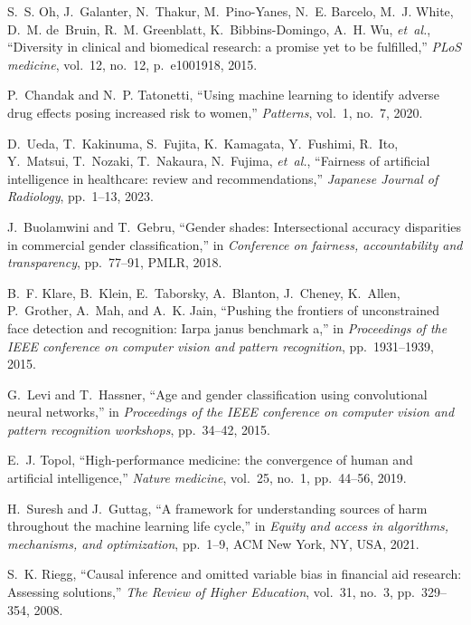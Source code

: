 \documentclass{article}
\begin{document}
\begin{thebibliography}{100}
	S.~S. Oh, J.~Galanter, N.~Thakur, M.~Pino-Yanes, N.~E. Barcelo, M.~J. White,
	D.~M. de~Bruin, R.~M. Greenblatt, K.~Bibbins-Domingo, A.~H. Wu, {\em et~al.},
	``Diversity in clinical and biomedical research: a promise yet to be
	fulfilled,'' {\em PLoS medicine}, vol.~12, no.~12, p.~e1001918, 2015.
	
	P.~Chandak and N.~P. Tatonetti, ``Using machine learning to identify adverse
	drug effects posing increased risk to women,'' {\em Patterns}, vol.~1, no.~7,
	2020.
	
	D.~Ueda, T.~Kakinuma, S.~Fujita, K.~Kamagata, Y.~Fushimi, R.~Ito, Y.~Matsui,
	T.~Nozaki, T.~Nakaura, N.~Fujima, {\em et~al.}, ``Fairness of artificial
	intelligence in healthcare: review and recommendations,'' {\em Japanese
		Journal of Radiology}, pp.~1--13, 2023.
	
	J.~Buolamwini and T.~Gebru, ``Gender shades: Intersectional accuracy
	disparities in commercial gender classification,'' in {\em Conference on
		fairness, accountability and transparency}, pp.~77--91, PMLR, 2018.
	
	B.~F. Klare, B.~Klein, E.~Taborsky, A.~Blanton, J.~Cheney, K.~Allen,
	P.~Grother, A.~Mah, and A.~K. Jain, ``Pushing the frontiers of unconstrained
	face detection and recognition: Iarpa janus benchmark a,'' in {\em
		Proceedings of the IEEE conference on computer vision and pattern
		recognition}, pp.~1931--1939, 2015.
	
	G.~Levi and T.~Hassner, ``Age and gender classification using convolutional
	neural networks,'' in {\em Proceedings of the IEEE conference on computer
		vision and pattern recognition workshops}, pp.~34--42, 2015.
	
	E.~J. Topol, ``High-performance medicine: the convergence of human and
	artificial intelligence,'' {\em Nature medicine}, vol.~25, no.~1, pp.~44--56,
	2019.
	
	H.~Suresh and J.~Guttag, ``A framework for understanding sources of harm
	throughout the machine learning life cycle,'' in {\em Equity and access in
		algorithms, mechanisms, and optimization}, pp.~1--9, ACM New York, NY, USA,
	2021.
	
	S.~K. Riegg, ``Causal inference and omitted variable bias in financial aid
	research: Assessing solutions,'' {\em The Review of Higher Education},
	vol.~31, no.~3, pp.~329--354, 2008.
	

\end{thebibliography}
\end{document}

